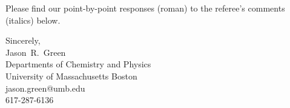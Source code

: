 Please find our point-by-point responses (roman) to the referee's comments (italics) below.



\medskip

\noindent Sincerely,\\


\noindent Jason~R.~Green\\
Departments of Chemistry and Physics\\
University of Massachusetts Boston\\
jason.green@umb.edu\\
617-287-6136%

\newpage


\newpage





